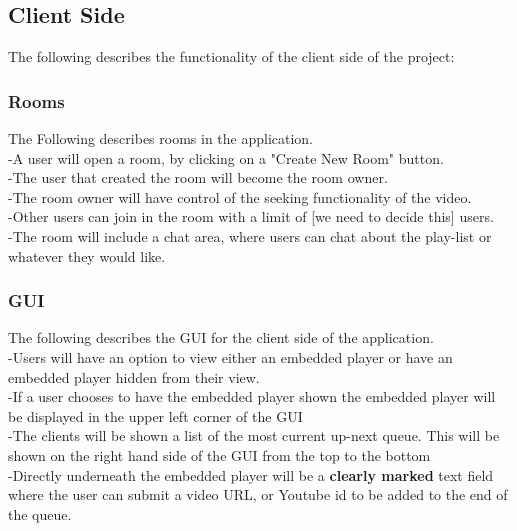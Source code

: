 \documentclass{article}
\begin{document}
\subsection{Client Side}

The following describes the functionality of the client side of the project:\\

\subsubsection{Rooms}
The Following describes rooms in the application.\\

-A user will open a room, by clicking on a "Create New Room" button.\\

-The user that created the room will become the room owner.\\

-The room owner will have control of the seeking functionality of the video.\\

-Other users can join in the room with a limit of [we need to decide this] users.\\

-The room will include a chat area, where users can chat about the play-list or whatever they would like.\\

\subsubsection{GUI}
The following describes the GUI for the client side of the application.\\

-Users will have an option to view either an embedded player or have an embedded player hidden from their view.\\

-If a user chooses to have the embedded player shown the embedded player will be displayed in the upper left corner of the GUI\\

-The clients will be shown a list of the most current up-next queue. This will be shown on the right hand side of the GUI from the top to the bottom\\

-Directly underneath the embedded player will be a \textbf{clearly marked} text field where the user can submit a video URL, or Youtube id to be added to the end of the queue.\\
\end{document}
